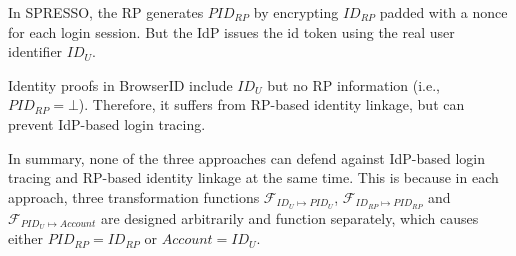 In SPRESSO, the RP generates $PID_{RP}$ by encrypting $ID_{RP}$ padded with a nonce %
for each login session.  But the IdP issues the id token using the real user identifier $ID_U$.

Identity proofs in BrowserID include $ID_U$ but no RP information (i.e., $PID_{RP} = \bot$). Therefore, it suffers from RP-based identity linkage, but can prevent IdP-based login tracing.

In summary, none of the three approaches can defend against IdP-based login tracing and RP-based identity linkage at the same time. This is because in each approach, three transformation functions $\mathcal{F}_{ID_{U} \mapsto PID_U}$, $\mathcal{F}_{ID_{RP} \mapsto PID_{RP}}$ and $\mathcal{F}_{PID_{U} \mapsto Account}$ are designed arbitrarily and function separately, which causes either $PID_{RP} = ID_{RP}$ or $Account = ID_U$.

